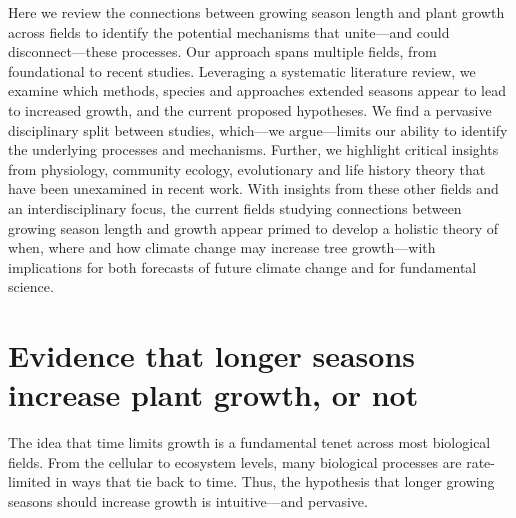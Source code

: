 \documentclass[11pt]{article}
\begin{document}
Here we review the connections between growing season length and plant growth across fields to identify the potential mechanisms that unite---and could disconnect---these processes. Our approach spans multiple fields, from foundational to recent studies. Leveraging a systematic literature review, we examine which methods, species and approaches extended seasons appear to lead to increased growth, and the current proposed hypotheses. We find a pervasive disciplinary split between studies, which---we argue---limits our ability to identify the underlying processes and mechanisms. Further, we highlight critical insights from physiology, community ecology, evolutionary and life history theory that have been unexamined in recent work. With insights from these other fields and an interdisciplinary focus, the current fields studying connections between growing season length and growth appear primed to develop a holistic theory of when, where and how climate change may increase tree growth---with implications for both forecasts of future climate change and for fundamental science.
 
\section*{Evidence that longer seasons increase plant growth, or not}
The idea that time limits growth is a fundamental tenet across most biological fields. From the cellular to ecosystem levels, many biological processes are rate-limited in ways that tie back to time. Thus, the hypothesis that longer growing seasons should increase growth is intuitive---and pervasive. 
\end{document}
